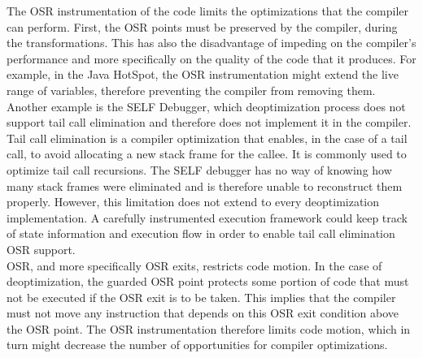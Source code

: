 The OSR instrumentation of the code limits the optimizations that the compiler can perform.
First, the OSR points must be preserved by the compiler, during the transformations.
This has also the disadvantage of impeding on the compiler's performance and more specifically on the quality of the code that it produces.
For example, in the Java HotSpot\cite{paleczny2001java}, the OSR instrumentation might extend the live range of variables, therefore preventing the compiler from removing them.
Another example is the SELF Debugger\cite{holzle1992debugging}, which deoptimization process does not support tail call elimination and therefore does not implement it in the compiler.
Tail call elimination is a compiler optimization that enables, in the case of a tail call, to avoid allocating a new stack frame for the callee. 
It is commonly used to optimize tail call recursions.
The SELF debugger has no way of knowing how many stack frames were eliminated and is therefore unable to reconstruct them properly.
However, this limitation does not extend to every deoptimization implementation.
A carefully instrumented execution framework could keep track of state information and execution flow in order to enable tail call elimination OSR support.\\

OSR, and more specifically OSR exits, restricts code motion. 
In the case of deoptimization, the guarded OSR point protects some portion of code that must not be executed if the OSR exit is to be taken.
This implies that the compiler must not move any instruction that depends on this OSR exit condition above the OSR point.
The OSR instrumentation therefore limits code motion, which in turn might decrease the number of opportunities for compiler optimizations.